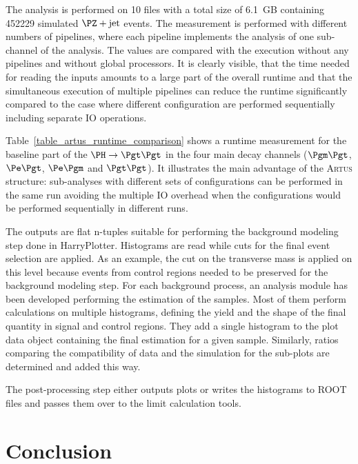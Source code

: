\documentclass[3p]{elsarticle}
\newcommand{\software}[1]{\textsc{#1}\xspace}
\newcommand{\artus}{\software{Artus}}
\begin{document}
\begin{table}[!ht]
{The analysis is performed on 10 files with a total size of 6.1~GB containing 452229 simulated $\PZ+\text{jet}$ events.
The measurement is performed with different numbers of pipelines, where each pipeline implements the analysis of one sub-channel of the analysis.
The values are compared with the execution without any pipelines and without global processors.
It is clearly visible, that the time needed for reading the inputs amounts to a large part of the overall runtime and that the simultaneous execution of multiple pipelines can reduce the runtime significantly compared to the case where different configuration are performed sequentially including separate IO operations.}
\label{table_artus_runtime_comparison}
\end{table}

Table~\ref{table_artus_runtime_comparison} shows a runtime measurement for the baseline part of the $\PH\to\Pgt\Pgt$ in the four main decay channels ($\Pgm\Pgt$, $\Pe\Pgt$, $\Pe\Pgm$ and $\Pgt\Pgt$).
It illustrates the main advantage of the \artus structure: sub-analyses with different sets of configurations can be performed in the same run avoiding the multiple IO overhead when the configurations would be performed sequentially in different runs.

The outputs are flat n-tuples suitable for performing the background modeling step done in HarryPlotter.
Histograms are read while cuts for the final event selection are applied.
As an example, the cut on the transverse mass is applied on this level because events from control regions needed to be preserved for the background modeling step.
For each background process, an analysis module has been developed performing the estimation of the samples.
Most of them perform calculations on multiple histograms, defining the yield and the shape of the final quantity in signal and control regions.
They add a single histogram to the plot data object containing the final estimation for a given sample.
Similarly, ratios comparing the compatibility of data and the simulation for the sub-plots are determined and added this way.

The post-processing step either outputs plots or writes the histograms to ROOT files and passes them over to the limit calculation tools.

\section{Conclusion}
\label{section_conclusion}
\end{document}
